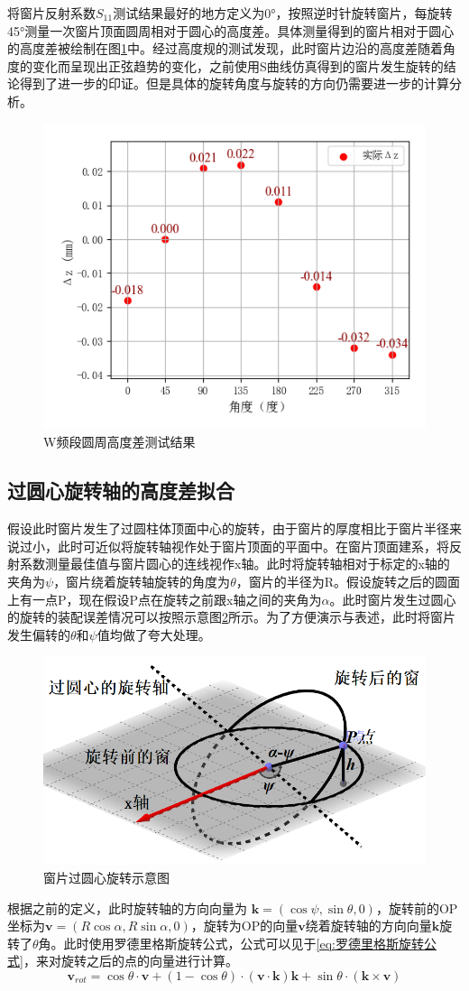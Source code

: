 \documentclass[master]{thesis-uestc}
\begin{document}
将窗片反射系数$S_{11}$测试结果最好的地方定义为0°，按照逆时针旋转窗片，每旋转45°测量一次窗片顶面圆周相对于圆心的高度差。具体测量得到的窗片相对于圆心的高度差被绘制在图\ref{fig:W频段圆周高度差测试结果}中。经过高度规的测试发现，此时窗片边沿的高度差随着角度的变化而呈现出正弦趋势的变化，之前使用S曲线仿真得到的窗片发生旋转的结论得到了进一步的印证。但是具体的旋转角度与旋转的方向仍需要进一步的计算分析。
\begin{figure}[!htb]
    \centering
    \includegraphics[width=0.35\linewidth]{pic/chapter5/可视化高度差.png}
    \caption{W频段圆周高度差测试结果}
    \label{fig:W频段圆周高度差测试结果}
\end{figure}

\subsection{过圆心旋转轴的高度差拟合}
假设此时窗片发生了过圆柱体顶面中心的旋转，由于窗片的厚度相比于窗片半径来说过小，此时可近似将旋转轴视作处于窗片顶面的平面中。在窗片顶面建系，将反射系数测量最佳值与窗片圆心的连线视作x轴。此时将旋转轴相对于标定的x轴的夹角为$\psi$，窗片绕着旋转轴旋转的角度为$\theta$，窗片的半径为R。假设旋转之后的圆面上有一点P，现在假设P点在旋转之前跟x轴之间的夹角为\(\alpha \)。此时窗片发生过圆心的旋转的装配误差情况可以按照示意图\ref{fig:过圆心旋转示意图}所示。为了方便演示与表述，此时将窗片发生偏转的\(\theta\)和\(\psi\)值均做了夸大处理。
\begin{figure}[!htb]
    \centering
    \includegraphics[width=0.5\linewidth]{pic/chapter5/过圆心旋转示意图.png}
    \caption{窗片过圆心旋转示意图}
    \label{fig:过圆心旋转示意图}
\end{figure}

根据之前的定义，此时旋转轴的方向向量为 \(\mathbf{k} = (\cos\psi, \sin \theta, 0)\)，旋转前的OP坐标为\(\mathbf{v} = (R\cos \alpha, R\sin \alpha, 0)\)，旋转为OP的向量$\mathbf{v}$绕着旋转轴的方向向量\(\mathbf{k}\)旋转了\(\theta \)角。此时使用罗德里格斯旋转公式，公式可以见于\ref{eq:罗德里格斯旋转公式}，来对旋转之后的点的向量进行计算。
\begin{equation}\label{eq:罗德里格斯旋转公式}
    \mathbf{v}_{rot} = \cos\theta \cdot \mathbf{v} + (1 - \cos\theta) \cdot (\mathbf{v} \cdot \mathbf{k}) \mathbf{k} + \sin\theta \cdot (\mathbf{k} \times \mathbf{v})
\end{equation}
\end{document}
